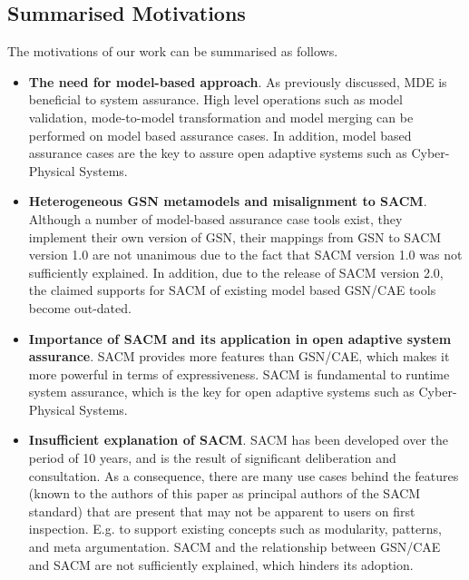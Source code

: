 \subsection{Summarised Motivations}
The motivations of our work can be summarised as follows. 
\begin{itemize}
	
	
	
	\item \textbf{The need for model-based approach}. 
	As previously discussed, MDE is beneficial to system assurance. 
	High level operations such as model validation, mode-to-model transformation and model merging can be performed on model based assurance cases. In addition, model based assurance cases are the key to assure open adaptive systems such as Cyber-Physical Systems.
	\item \textbf{Heterogeneous GSN metamodels and misalignment to SACM}.
	Although a number of model-based assurance case tools exist, they implement their own version of GSN, their mappings from GSN to SACM version 1.0 are not unanimous due to the fact that SACM version 1.0 was not sufficiently explained. 
	In addition, due to the release of SACM version 2.0, the claimed supports for SACM of existing model based GSN/CAE tools become out-dated.
	\item \textbf{Importance of SACM and its application in open adaptive system assurance}. SACM provides more features than GSN/CAE, which makes it more powerful in terms of expressiveness. 
	SACM is fundamental to runtime system assurance, which is the key for open adaptive systems such as Cyber-Physical Systems.
	\item \textbf{Insufficient explanation of SACM}. SACM has been developed over the period of 10 years, and is the result of significant deliberation and consultation. As a consequence, there are many use cases behind the features (known to the authors of this paper as principal authors of the SACM standard) that are present that may not be apparent to users on first inspection.
	E.g. to support existing concepts such as modularity, patterns, and meta argumentation. 
	SACM and the relationship between GSN/CAE and SACM are not sufficiently explained, which hinders its adoption. 
\end{itemize}

